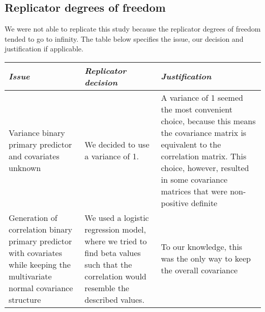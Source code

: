 \documentclass[10,a4paperpaper,]{article}
\begin{document}
\subsection{Replicator degrees of freedom}

We were not able to replicate this study because the replicator degrees
of freedom tended to go to infinity. The table below specifies the
issue, our decision and justification if applicable.

\begin{longtable}[]{@{}lll@{}}
\toprule
\begin{minipage}[b]{0.30\columnwidth}\raggedright
\emph{Issue}\strut
\end{minipage} & \begin{minipage}[b]{0.30\columnwidth}\raggedright
\emph{Replicator decision}\strut
\end{minipage} & \begin{minipage}[b]{0.30\columnwidth}\raggedright
\emph{Justification}\strut
\end{minipage}\tabularnewline
\midrule
\endhead
\begin{minipage}[t]{0.30\columnwidth}\raggedright
Variance binary primary predictor and covariates unknown\strut
\end{minipage} & \begin{minipage}[t]{0.30\columnwidth}\raggedright
We decided to use a variance of 1.\strut
\end{minipage} & \begin{minipage}[t]{0.30\columnwidth}\raggedright
A variance of 1 seemed the most convenient choice, because this means
the covariance matrix is equivalent to the correlation matrix. This
choice, however, resulted in some covariance matrices that were
non-positive definite\strut
\end{minipage}\tabularnewline
\begin{minipage}[t]{0.30\columnwidth}\raggedright
Generation of correlation binary primary predictor with covariates while
keeping the multivariate normal covariance structure\strut
\end{minipage} & \begin{minipage}[t]{0.30\columnwidth}\raggedright
We used a logistic regression model, where we tried to find beta values
such that the correlation would resemble the described values.\strut
\end{minipage} & \begin{minipage}[t]{0.30\columnwidth}\raggedright
To our knowledge, this was the only way to keep the overall covariance

\end{minipage}
\end{longtable}
\end{document}
